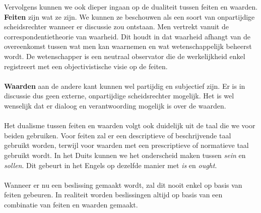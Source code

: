 \documentclass[../summary.tex]{subfiles}
\begin{document}
	Vervolgens kunnen we ook dieper ingaan op de dualiteit tussen feiten en waarden. \textbf{Feiten} zijn wat ze zijn. We kunnen ze beschouwen als een soort van onpartijdige scheidsrechter wanneer er discussie zou ontstaan. Men vertrekt vanuit de correspondentietheorie van waarheid. Dit houdt in dat waarheid afhangt van de overeenkomst tussen wat men kan waarnemen en wat wetenschappelijk beheerst wordt. De wetenschapper is een neutraal observator die de werkelijkheid enkel registreert met een objectivistische visie op de feiten.
	\\\\
	\textbf{Waarden} aan de andere kant kunnen wel partijdig en subjectief zijn. Er is in discussie dus geen externe, onpartijdige scheidsrechter mogelijk. Het is wel wenselijk dat er dialoog en verantwoording mogelijk is over de waarden. 
	\\\\
	Het dualisme tussen feiten en waarden volgt ook duidelijk uit de taal die we voor beiden gebruiken. Voor feiten zal er een descriptieve of beschrijvende taal gebruikt worden, terwijl voor waarden met een prescriptieve of normatieve taal gebruikt wordt. In het Duits kunnen we het onderscheid maken tussen \textit{sein} en \textit{sollen}. Dit gebeurt in het Engels op dezelfde manier met \textit{is} en \textit{ought}. 
	\\\\
	Wanneer er nu een beslissing gemaakt wordt, zal dit nooit enkel op basis van feiten gebeuren. In realiteit worden beslissingen altijd op basis van een combinatie van feiten en waarden gemaakt. 
	
\end{document}
